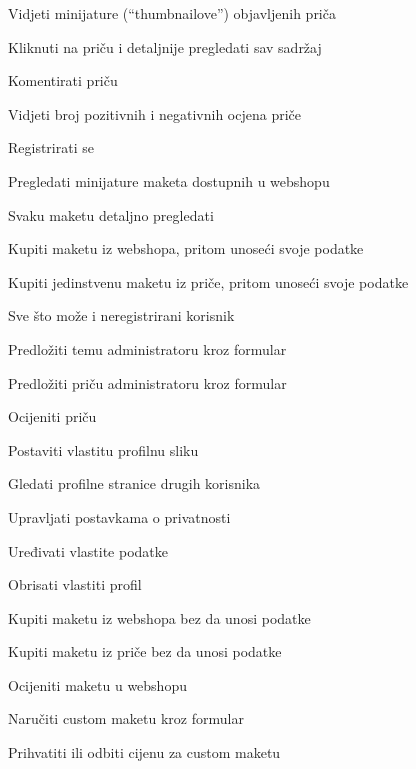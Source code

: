 			
			\begin{packed_enum}
				\item  {}
				
				\begin{packed_enum}
					
					\item Vidjeti minijature (“thumbnailove”) objavljenih priča
					\item Kliknuti na priču i detaljnije pregledati sav sadržaj
					\item Komentirati priču
					\item Vidjeti broj pozitivnih i negativnih ocjena priče
					\item Registrirati se
					\item Pregledati minijature maketa dostupnih u webshopu
					\item Svaku maketu detaljno pregledati
					\item Kupiti maketu iz webshopa, pritom unoseći svoje podatke
					\item Kupiti jedinstvenu maketu iz priče, pritom unoseći svoje podatke
				\end{packed_enum}
			
				\item  {}
				
				\begin{packed_enum}
					
					\item Sve što može i neregistrirani korisnik
					\item Predložiti temu administratoru kroz formular
					\item Predložiti priču administratoru kroz formular
					\item Ocijeniti priču
					\item Postaviti vlastitu profilnu sliku
					\item Gledati profilne stranice drugih korisnika
					\item Upravljati postavkama o privatnosti
					\item Uređivati vlastite podatke
					\item Obrisati vlastiti profil
					\item Kupiti maketu iz webshopa bez da unosi podatke
					\item Kupiti maketu iz priče bez da unosi podatke
					\item Ocijeniti maketu u webshopu
					\item Naručiti custom maketu kroz formular
					\item Prihvatiti ili odbiti cijenu za custom maketu


\end{packed_enum}
\end{packed_enum}
